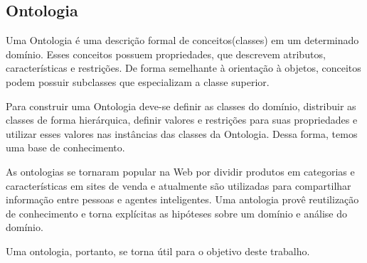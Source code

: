 \subsection{Ontologia}
Uma Ontologia é uma descrição formal de conceitos(classes) em um determinado domínio. Esses conceitos possuem propriedades, que descrevem atributos, características e restrições. De forma semelhante à orientação à objetos, conceitos podem possuir subclasses que especializam a classe superior.

Para construir uma Ontologia deve-se definir as classes do domínio, distribuir as classes de forma hierárquica, definir valores e restrições para suas propriedades e utilizar esses valores nas instâncias das classes da Ontologia. Dessa forma, temos uma base de conhecimento.

As ontologias se tornaram popular na Web por dividir produtos em categorias e características em sites de venda e atualmente são utilizadas para compartilhar informação entre pessoas e agentes inteligentes. Uma antologia provê reutilização de conhecimento e torna explícitas as hipóteses sobre um domínio e análise do domínio.

Uma ontologia, portanto, se torna útil para o objetivo deste trabalho.
